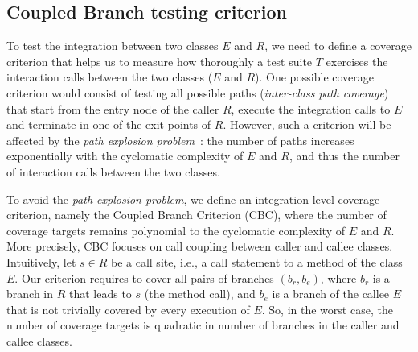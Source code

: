 \subsection{Coupled Branch testing criterion}

\label{sec:approach:coupledBranchDef}



To test the integration between two classes $E$ and $R$, we need to define a coverage criterion that helps us to measure how thoroughly a test suite $T$ exercises the interaction calls between the two classes ($E$ and $R$). One possible coverage criterion would consist of testing all possible paths (\textit{inter-class path coverage}) that start from the entry node of the caller $R$, execute the integration calls to $E$ and terminate in one of the exit points of $R$. However, such a criterion will be affected by the \textit{path explosion problem}~\cite{cadar2013symbolic}: the number of paths increases exponentially with the cyclomatic complexity of $E$ and $R$, and thus the number of interaction calls between the two classes.

To avoid the \textit{path explosion problem}, we define an integration-level coverage criterion, namely the Coupled Branch Criterion (CBC), where the number of coverage targets remains polynomial to the cyclomatic complexity of $E$ and $R$. More precisely, CBC focuses on call coupling between caller and callee classes. Intuitively, let $s \in R$ be a call site, i.e., a call statement to a method of the class $E$. Our criterion requires to cover all pairs of branches $ (b_r, b_e)$, where $b_r$ is a branch in $R$ that leads to $s$ (the method call), and $b_e$ is a branch of the callee $E$ that is not trivially covered by every execution of $E$. So, in the worst case, the number of coverage targets is quadratic in number of branches in the caller and callee classes.


